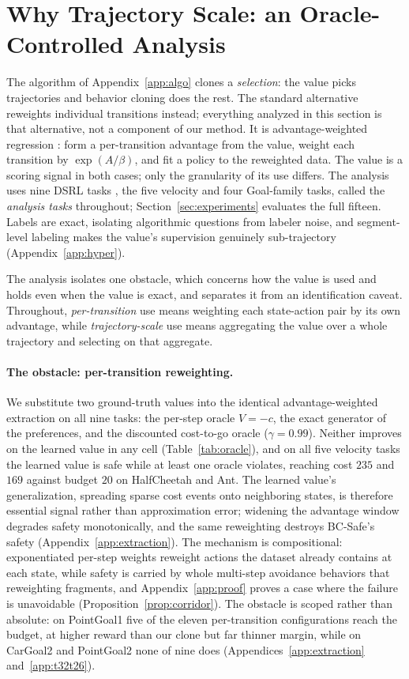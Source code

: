 \documentclass{article} %
\begin{document}
\section{Why Trajectory Scale: an Oracle-Controlled Analysis}
\label{sec:analysis}

The algorithm of Appendix~\ref{app:algo} clones a \emph{selection}: the value picks trajectories and behavior cloning does the rest. The standard alternative reweights individual transitions instead; everything analyzed in this section is that alternative, not a component of our method. It is advantage-weighted regression \citep{peng2019awr}: form a per-transition advantage from the value, weight each transition by $\exp(A/\beta)$, and fit a policy to the reweighted data. The value is a scoring signal in both cases; only the granularity of its use differs. The analysis uses nine DSRL tasks \citep{liu2024dsrl}, the five velocity and four Goal-family tasks, called the \emph{analysis tasks} throughout; Section~\ref{sec:experiments} evaluates the full fifteen. Labels are exact, isolating algorithmic questions from labeler noise, and segment-level labeling makes the value's supervision genuinely sub-trajectory (Appendix~\ref{app:hyper}).

The analysis isolates one obstacle, which concerns how the value is used and holds even when the value is exact, and separates it from an identification caveat. Throughout, \emph{per-transition} use means weighting each state-action pair by its own advantage, while \emph{trajectory-scale} use means aggregating the value over a whole trajectory and selecting on that aggregate.

\paragraph{The obstacle: per-transition reweighting.}
We substitute two ground-truth values into the identical advantage-weighted extraction on all nine tasks: the per-step oracle $V = -c$, the exact generator of the preferences, and the discounted cost-to-go oracle ($\gamma = 0.99$). Neither improves on the learned value in any cell (Table~\ref{tab:oracle}), and on all five velocity tasks the learned value is safe while at least one oracle violates, reaching cost $235$ and $169$ against budget $20$ on HalfCheetah and Ant. The learned value's generalization, spreading sparse cost events onto neighboring states, is therefore essential signal rather than approximation error; widening the advantage window degrades safety monotonically, and the same reweighting destroys BC-Safe's safety (Appendix~\ref{app:extraction}). The mechanism is compositional: exponentiated per-step weights reweight actions the dataset already contains at each state, while safety is carried by whole multi-step avoidance behaviors that reweighting fragments, and Appendix~\ref{app:proof} proves a case where the failure is unavoidable (Proposition~\ref{prop:corridor}). The obstacle is scoped rather than absolute: on PointGoal1 five of the eleven per-transition configurations reach the budget, at higher reward than our clone but far thinner margin, while on CarGoal2 and PointGoal2 none of nine does (Appendices~\ref{app:extraction} and~\ref{app:t32t26}).
\end{document}

